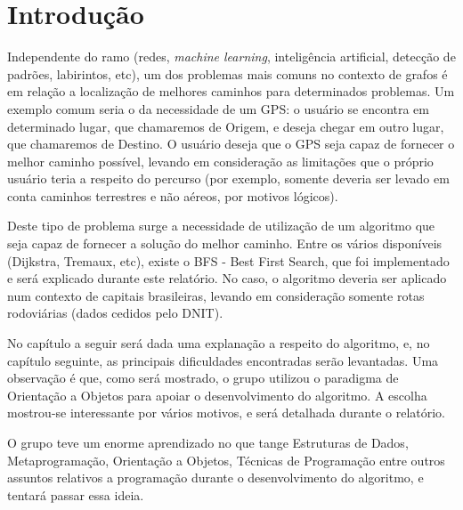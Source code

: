 \chapter*[Introdução]{Introdução}

Independente do ramo (redes, \textit{machine learning}, inteligência artificial, detecção de padrões, labirintos, etc), um dos problemas mais comuns no contexto de grafos é em relação a localização de melhores caminhos para determinados problemas. Um exemplo comum seria o da necessidade de um GPS: o usuário se encontra em determinado lugar, que chamaremos de Origem, e deseja chegar em outro lugar, que chamaremos de Destino. O usuário deseja que o GPS seja capaz de fornecer o melhor caminho possível, levando em consideração as limitações que o próprio usuário teria a respeito do percurso (por exemplo, somente deveria ser levado em conta caminhos terrestres e não aéreos, por motivos lógicos).

Deste tipo de problema surge a necessidade de utilização de um algoritmo que seja capaz de fornecer a solução do melhor caminho. Entre os vários disponíveis (Dijkstra, Tremaux, etc), existe o BFS - Best First Search, que foi implementado e será explicado durante este relatório. No caso, o algoritmo deveria ser aplicado num contexto de capitais brasileiras, levando em consideração somente rotas rodoviárias (dados cedidos pelo DNIT).

No capítulo a seguir será dada uma explanação a respeito do algoritmo, e, no capítulo seguinte, as principais dificuldades encontradas serão levantadas. Uma observação é que, como será mostrado, o grupo utilizou o paradigma de Orientação a Objetos para apoiar o desenvolvimento do algoritmo. A escolha mostrou-se interessante por vários motivos, e será detalhada durante o relatório.

O grupo teve um enorme aprendizado no que tange Estruturas de Dados, Metaprogramação, Orientação a Objetos, Técnicas de Programação entre outros assuntos relativos a programação durante o desenvolvimento do algoritmo, e tentará passar essa ideia.